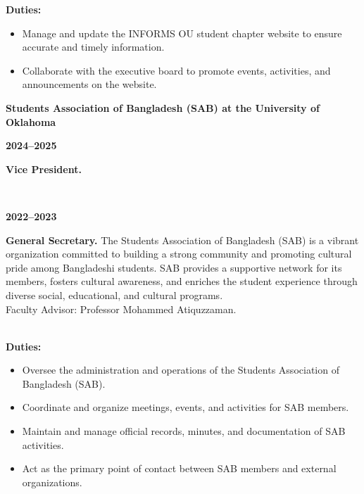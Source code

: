 \documentclass[a4paper,11pt]{article}
\begin{document}
\begin{flushleft}
\textbf{Duties:}
\begin{itemize}
    \item Manage and update the INFORMS OU student chapter website to ensure accurate and timely information.
    \item Collaborate with the executive board to promote events, activities, and announcements on the website.
\end{itemize}

\textcolor{mycolor}{\textbf{Students Association of Bangladesh (SAB) at the University of Oklahoma}}\\
\parbox[t]{2.5cm}{\textbf{2024--2025}}%
\parbox[t]{\dimexpr\textwidth-2.5cm\relax}{%
\textbf{Vice President.}}\\[0.5em]
\parbox[t]{2.5cm}{\textbf{2022--2023}}%
\parbox[t]{\dimexpr\textwidth-2.5cm\relax}{%
\textbf{General Secretary.} The Students Association of Bangladesh (SAB) is a vibrant organization committed to building a strong community and promoting cultural pride among Bangladeshi students. SAB provides a supportive network for its members, fosters cultural awareness, and enriches the student experience through diverse social, educational, and cultural programs.\\
Faculty Advisor: Professor Mohammed Atiquzzaman.}\\

\textbf{Duties:}
\begin{itemize}
    \item Oversee the administration and operations of the Students Association of Bangladesh (SAB).
    \item Coordinate and organize meetings, events, and activities for SAB members.
    \item Maintain and manage official records, minutes, and documentation of SAB activities.
    \item Act as the primary point of contact between SAB members and external organizations.
\end{itemize}
\end{flushleft}
\end{document}

